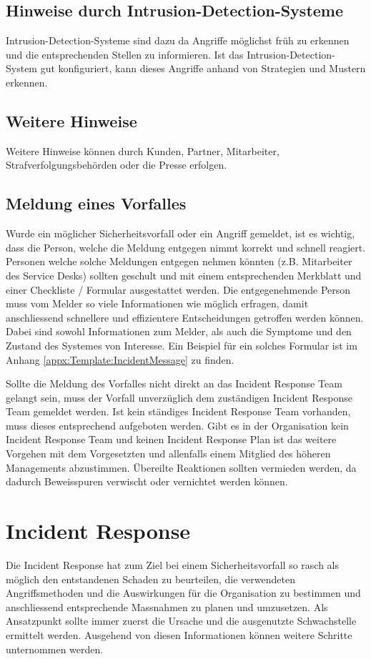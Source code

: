 \subsection{Hinweise durch Intrusion-Detection-Systeme}
Intrusion-Detection-Systeme sind dazu da Angriffe möglichst früh zu erkennen und die entsprechenden Stellen zu informieren. Ist das Intrusion-Detection-System gut konfiguriert, kann dieses Angriffe anhand von Strategien und Mustern erkennen.


\subsection{Weitere Hinweise}
Weitere Hinweise können durch Kunden, Partner, Mitarbeiter, Strafverfolgungsbehörden oder die Presse erfolgen.

\subsection{Meldung eines Vorfalles}\label{subsec:IncidentDetection:MeldungVorfall}
Wurde ein möglicher Sicherheitsvorfall oder ein Angriff gemeldet, ist es wichtig, dass die Person, welche die Meldung entgegen nimmt korrekt und schnell reagiert. Personen welche solche Meldungen entgegen nehmen könnten (z.B. Mitarbeiter des Service Desks) sollten geschult und mit einem entsprechenden Merkblatt und einer Checkliste / Formular ausgestattet werden. Die entgegenehmende Person muss vom Melder so viele Informationen wie möglich erfragen, damit anschliessend schnellere und effizientere Entscheidungen getroffen werden können. Dabei sind sowohl Informationen zum Melder, als auch die Symptome und den Zustand des Systemes von Interesse. Ein Beispiel für ein solches Formular ist im Anhang \ref{appx:Template:IncidentMessage}  zu finden.

Sollte die Meldung des Vorfalles nicht direkt an das Incident Response Team gelangt sein, muss der Vorfall unverzüglich dem zuständigen Incident Response Team gemeldet werden. Ist kein ständiges Incident Response Team vorhanden, muss dieses entsprechend aufgeboten werden. Gibt es in der Organisation kein Incident Response Team und keinen Incident Response Plan ist das weitere Vorgehen mit dem Vorgesetzten und allenfalls einem Mitglied des höheren Managements abzustimmen. Übereilte Reaktionen sollten vermieden werden, da dadurch Beweisspuren verwischt oder vernichtet werden können. 


\section{Incident Response}
Die Incident Response hat zum Ziel bei einem Sicherheitsvorfall so rasch als möglich den entstandenen Schaden zu beurteilen, die verwendeten Angriffsmethoden und die Auswirkungen für die Organisation zu bestimmen und anschliessend entsprechende Massnahmen zu planen und umzusetzen. Als Ansatzpunkt sollte immer zuerst die Ursache und die ausgenutzte Schwachstelle ermittelt werden. Ausgehend von diesen Informationen können weitere Schritte unternommen werden.

